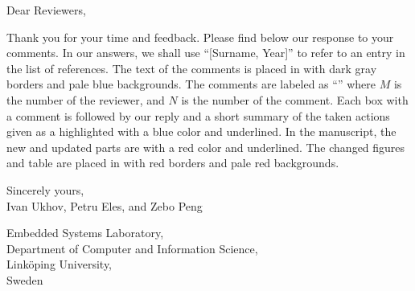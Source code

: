 Dear Reviewers,

\vspace{2em}
\noindent Thank you for your time and feedback. Please find below our response
to your comments. In our answers, we shall use ``[Surname, Year]'' to refer to
an entry in the list of references. The text of the comments is placed in
 with dark gray borders and pale blue backgrounds. The
comments are labeled as ``'' where $M$ is the number of the
reviewer, and $N$ is the number of the comment. Each box with a comment is
followed by our reply and a short summary of the taken actions given as a
 highlighted with a blue color and underlined. In the
manuscript, the new and updated parts are  with a red color and
underlined. The changed figures and table are placed in  with
red borders and pale red backgrounds.

\vspace{2em}
\noindent Sincerely yours,\\
Ivan Ukhov, Petru Eles, and Zebo Peng

\vspace{1em}
\noindent Embedded Systems Laboratory,\\
Department of Computer and Information Science,\\
Link\"{o}ping University,\\
Sweden

$ $
